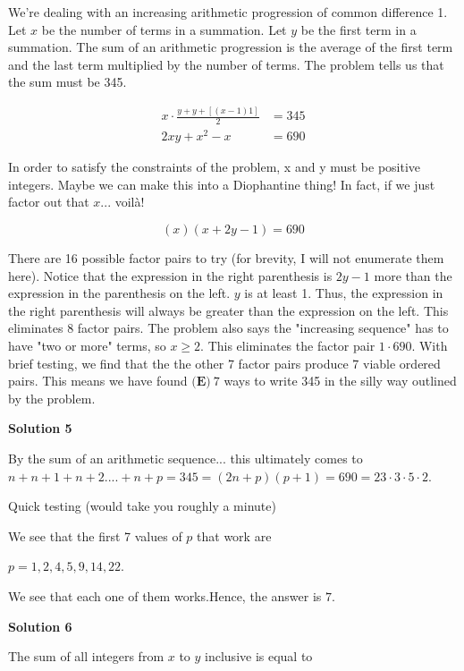 \begin{enumerate}
We're dealing with an increasing arithmetic progression of common difference 1. Let $x$ be the number of terms in a summation. Let $y$ be the first term in a summation. The sum of an arithmetic progression is the average of the first term and the last term multiplied by the number of terms. The problem tells us that the sum must be 345.

 
 \begin{align*} x \cdot \frac{y+y+[(x-1)1]}{2}&=345 \\ 2xy+x^2-x&=690 \end{align*}


 In order to satisfy the constraints of the problem, x and y must be positive integers. Maybe we can make this into a Diophantine thing! In fact, if we just factor out that $x$... voilà!

 
 \[(x)(x+2y-1)=690\]

 There are 16 possible factor pairs to try (for brevity, I will not enumerate them here). Notice that the expression in the right parenthesis is $2y-1$ more than the expression in the parenthesis on the left. $y$ is at least 1. Thus, the expression in the right parenthesis will always be greater than the expression on the left. This eliminates 8 factor pairs. The problem also says the "increasing sequence" has to have "two or more" terms, so $x \geqslant 2$. This eliminates the factor pair $1 \cdot 690$. With brief testing, we find that the the other 7 factor pairs produce 7 viable ordered pairs. This means we have found $\boxed{\textbf{(E)}\ 7}$ ways to write 345 in the silly way outlined by the problem.

 



\textbf{Solution 5}

By the sum of an arithmetic sequence... this ultimately comes to$n+n+1+n+2....+n+p=345=(2n+p)(p+1)=690=23\cdot3\cdot5\cdot2$.

 Quick testing (would take you roughly a minute)

 
We see that the first 7 values of $p$ that work are

 $p=1,2,4,5,9,14,22$.

 
We see that each one of them works.Hence, the answer is $\boxed{7}$.

 


 



\textbf{Solution 6}

The sum of all integers from $x$ to $y$ inclusive is equal to 


\end{enumerate}
